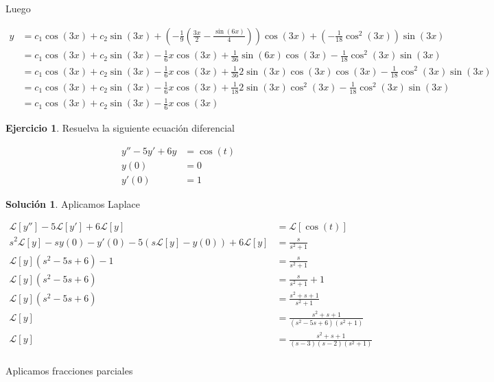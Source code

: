 \documentclass{article}
\theoremstyle{plain}
\theoremstyle{definition}
\newtheorem{ejer}[thm]{Ejercicio}
\newtheorem{sol}[thm]{Solución}
\begin{document}
Luego

\begin{align*}
    y &=   c_1\cos(3x)+c_2\sin(3x)+ \left( -\frac{1}{9}\left( \frac{3x}{2}-\frac{\sin(6x)}{4} \right) \right)\cos(3x)+ \left( -\frac{1}{18}\cos^2(3x) \right)\sin(3x) \\
    &=   c_1\cos(3x)+c_2\sin(3x)-\frac{1}{6}x\cos(3x)+\frac{1}{36}\sin(6x)\cos(3x)-\frac{1}{18}\cos^2(3x)\sin(3x) \\
    &=   c_1\cos(3x)+c_2\sin(3x)-\frac{1}{6}x\cos(3x)+\frac{1}{36}2\sin(3x)\cos(3x)\cos(3x)-\frac{1}{18}\cos^2(3x)\sin(3x) \\
     &=   c_1\cos(3x)+c_2\sin(3x)-\frac{1}{6}x\cos(3x)+\frac{1}{18}2\sin(3x)\cos^2(3x)-\frac{1}{18}\cos^2(3x)\sin(3x) \\
     &= c_1\cos(3x)+c_2\sin(3x)-\frac{1}{6}x\cos(3x)
\end{align*}




\newpage

\begin{ejer}Resuelva la siguiente ecuación diferencial
\end{ejer}


\begin{align*}
    y''-5y'+6y &=\cos(t) \\
    y(0) &= 0\\
    y'(0) &= 1
\end{align*}

\begin{sol}Aplicamos Laplace
\end{sol}

\begin{align*}
    \mathcal{L}[y'']-5\mathcal{L}[y']+6\mathcal{L}[y] &=\mathcal{L}[\cos(t)] \\
    s^2\mathcal{L}[y]-sy(0)-y'(0)-5(s\mathcal{L}[y]-y(0))+6\mathcal{L}[y] &= \frac{s}{s^2+1} \\
    \mathcal{L}[y](s^2-5s+6)-1 &= \frac{s}{s^2+1} \\
    \mathcal{L}[y](s^2-5s+6) &= \frac{s}{s^2+1}+1 \\
    \mathcal{L}[y](s^2-5s+6) &= \frac{s^2+s+1}{s^2+1} \\
    \mathcal{L}[y] &= \frac{s^2+s+1}{(s^2-5s+6)(s^2+1)} \\
    \mathcal{L}[y] &= \frac{s^2+s+1}{(s-3)(s-2)(s^2+1)} \\
\end{align*}

Aplicamos fracciones parciales
\end{document}
